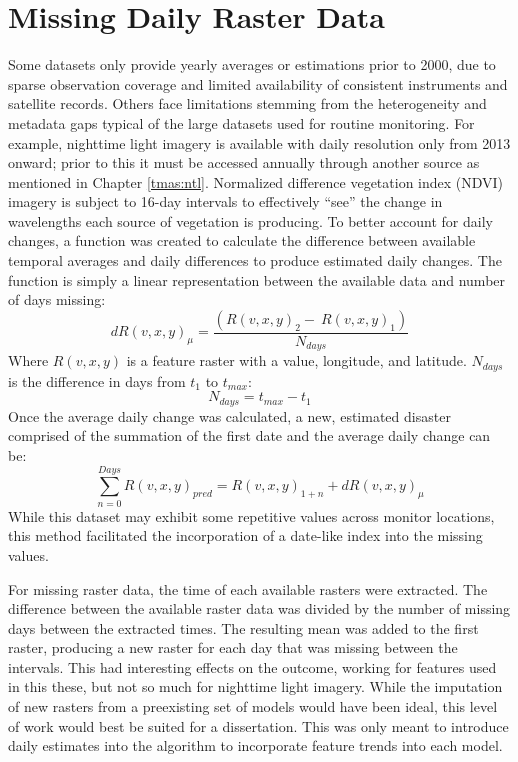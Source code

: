 \section{Missing Daily Raster Data} \label{methods:miar} Some datasets only provide yearly averages or estimations prior to 2000, due to sparse observation coverage and limited availability of consistent instruments and satellite records. Others face limitations stemming from the heterogeneity and metadata gaps typical of the large datasets used for routine monitoring. For example, nighttime light imagery is available with daily resolution only from 2013 onward; prior to this it must be accessed annually through another source as mentioned in Chapter \ref{tmas:ntl}. Normalized difference vegetation index (NDVI) imagery is subject to 16-day intervals to effectively “see” the change in wavelengths each source of vegetation is producing. To better account for daily changes, a function was created to calculate the difference between available temporal averages and daily differences to produce estimated daily changes. The function is simply a linear representation between the available data and number of days missing:
\[
dR\left(v,x,y\right)_\mu=\frac{\left({R(v,x,y)}_2-\ {R(v,x,y)}_1\right)}{N_{days}}
\]
Where $R\left(v,x,y\right)$ is a feature raster with a value, longitude, and latitude. $N_{days}$ is the difference in days from $t_1$ to $t_{max}$:
\[
N_{days}=t_{max}-t_1
\]
Once the average daily change was calculated, a new, estimated disaster comprised of the summation of the first date and the average daily change can be:
\[
\sum_{n=0}^{Days}{{R\left(v,x,y\right)}_{pred}={R\left(v,x,y\right)}_{1+n}+dR\left(v,x,y\right)_\mu}
\]
While this dataset may exhibit some repetitive values across monitor locations, this method facilitated the incorporation of a date-like index into the missing values.

For missing raster data, the time of each available rasters were extracted. The difference between the available raster data was divided by the number of missing days between the extracted times. The resulting mean was added to the first raster, producing a new raster for each day that was missing between the intervals. This had interesting effects on the outcome, working for features used in this these, but not so much for nighttime light imagery. While the imputation of new rasters from a preexisting set of models would have been ideal, this level of work would best be suited for a dissertation. This was only meant to introduce daily estimates into the algorithm to incorporate feature trends into each model.  

